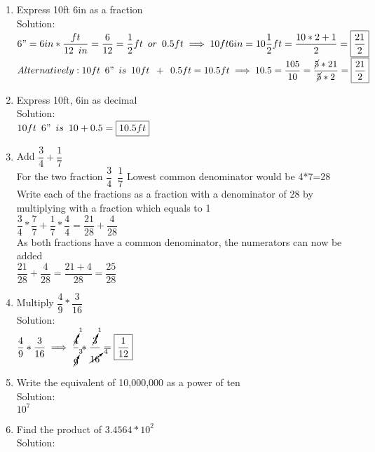 \begin{enumerate}[1.]
\item Express 10ft 6in as a fraction\\
Solution:\\
$6" = 6 in * \dfrac{ft}{12 \enspace in} = \dfrac{6}{12}=\dfrac{1}{2}ft \enspace or \enspace 0.5ft\implies 10ft 6in = 10\dfrac{1}{2}ft=\dfrac{10*2+1}{2}=\boxed{\dfrac{21}{2}}$\\
$Alternatively: 10 ft \enspace 6" \enspace is \enspace 10 ft \enspace + \enspace 0.5 ft= 10.5 ft \implies 10.5=\dfrac{105}{10} = \dfrac{\cancel{5}*21}{\cancel{5}*2}=\boxed{\dfrac{21}{2}}$
\item Express 10ft, 6in as decimal\\
Solution:\\
$10 ft \enspace 6" \enspace is \enspace 10 + 0.5 = \boxed{10.5 ft}$
\item Add $\dfrac{3}{4}+\dfrac{1}{7}$\\
For the two fraction $\dfrac{3}{4} \enspace \dfrac{1}{7} $
Lowest common denominator would be 4*7=28\\
\vspace{0.2cm}
Write each of the fractions as a fraction with a denominator of 28 by multiplying with a fraction which equals to 1\\
\vspace{0.2cm}
$\dfrac{3}{4}*\dfrac{7}{7}+\dfrac{1}{7}*\dfrac{4}{4}=\dfrac{21}{28}+\dfrac{4}{28}$\\
\vspace{0.2cm}
As both fractions have a common denominator, the numerators can now be added\\
\vspace{0.2cm}
$\dfrac{21}{28}+\dfrac{4}{28}=\dfrac{21+4}{28}=\boxed{\dfrac{25}{28}}$\\
\item Multiply $\dfrac{4}{9}*\dfrac{3}{16}$\\
Solution:\\
$\dfrac{4}{9}*\dfrac{3}{16} \implies \dfrac{\cancelto{1}{4}}{\cancelto{3}{9}}*\dfrac{\cancelto{1}{3}}{\cancelto{4}{16}}=\boxed{\dfrac{1}{12}}$\\
\vspace{0.2cm}
\item Write the equivalent of 10,000,000 as a power of ten\\
Solution:\\
$\boxed{10^7}$
\item Find the product of $3.4564*10^2$\\
Solution:\\

\end{enumerate}
